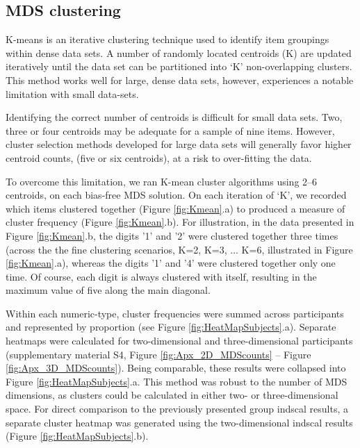 \subsection{MDS clustering}
K-means is an iterative clustering technique used to identify item groupings within dense data sets. A number of randomly located centroids (K) are updated iteratively until the data set can be partitioned into `K' non-overlapping clusters. This method works well for large, dense data sets, however, experiences a notable limitation with small data-sets.

Identifying the correct number of centroids is difficult for small data sets. Two, three or four centroids may be adequate for a sample of nine items. However, cluster selection methods developed for large data sets will generally favor higher centroid counts, (\eg five or six centroids), at a risk to over-fitting the data. 

To overcome this limitation, we ran K-mean cluster algorithms using 2--6 centroids, on each bias-free MDS solution. On each iteration of `K', we recorded which items clustered together (Figure \ref{fig:Kmean}.a) to produced a measure of cluster frequency (Figure \ref{fig:Kmean}.b). For illustration, in the data presented in Figure \ref{fig:Kmean}.b, the digits '1' and '2' were clustered together three times (across the the fine clustering scenarios, K=2, K=3, ... K=6, illustrated in Figure \ref{fig:Kmean}.a), whereas the digits '1' and '4' were clustered together only one time. Of course, each digit is always clustered with itself, resulting in the maximum value of five along the main diagonal.

Within each numeric-type, cluster frequencies were summed across participants and represented by proportion (see Figure \ref{fig:HeatMapSubjects}.a). Separate heatmaps were calculated for two-dimensional and three-dimensional participants (supplementary material S4, Figure \ref{fig:Apx_2D_MDScounts} -- Figure \ref{fig:Apx_3D_MDScounts}). Being comparable, these results were collapsed into Figure \ref{fig:HeatMapSubjects}.a. This method was robust to the number of MDS dimensions, as clusters could be calculated in either two- or three-dimensional space. For direct comparison to the previously presented group indscal results, a separate cluster heatmap was generated using the two-dimensional indscal results (Figure \ref{fig:HeatMapSubjects}.b).

